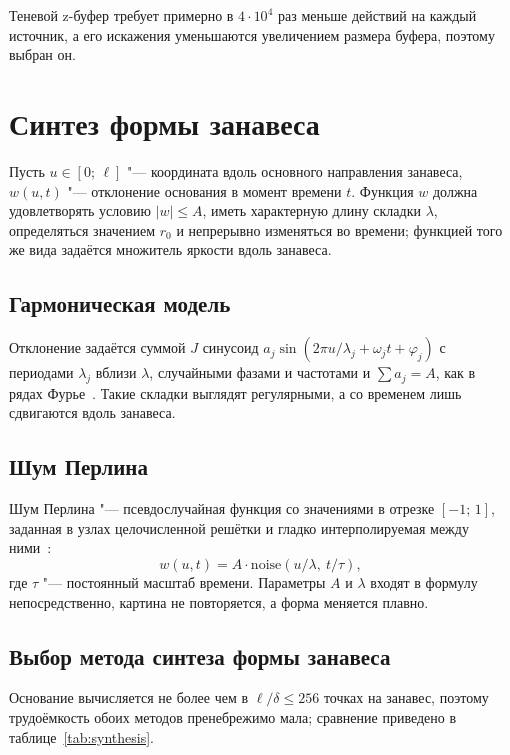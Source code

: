 Теневой z-буфер требует примерно в $4 \cdot 10^4$ раз меньше действий на каждый источник, а его искажения уменьшаются увеличением размера буфера, поэтому выбран он.

\section{Синтез формы занавеса}

Пусть $u \in [0;\, \ell]$ "--- координата вдоль основного направления занавеса, $w(u, t)$ "--- отклонение основания в момент времени $t$. Функция $w$ должна удовлетворять условию $|w| \leqslant A$, иметь характерную длину складки $\lambda$, определяться значением $r_0$ и непрерывно изменяться во времени; функцией того же вида задаётся множитель яркости вдоль занавеса.

\subsection{Гармоническая модель}

Отклонение задаётся суммой $J$ синусоид $a_j \sin(2\pi u / \lambda_j + \omega_j t + \varphi_j)$ с периодами $\lambda_j$ вблизи $\lambda$, случайными фазами и частотами и $\sum a_j = A$, как в рядах Фурье~\cite[с.~250]{gonzalez2012}. Такие складки выглядят регулярными, а со временем лишь сдвигаются вдоль занавеса.

\subsection{Шум Перлина}

Шум Перлина "--- псевдослучайная функция со значениями в отрезке $[-1;\, 1]$, заданная в узлах целочисленной решётки и гладко интерполируемая между ними~\cite{hill2002}:
\begin{equation}
	w(u, t) = A \cdot \mathrm{noise}\left( u / \lambda,\ t / \tau \right),
	\label{eq:perlin}
\end{equation}
где $\tau$ "--- постоянный масштаб времени. Параметры $A$ и $\lambda$ входят в формулу непосредственно, картина не повторяется, а форма меняется плавно.

\subsection{Выбор метода синтеза формы занавеса}

Основание вычисляется не более чем в $\ell / \delta \leqslant 256$ точках на занавес, поэтому трудоёмкость обоих методов пренебрежимо мала; сравнение приведено в таблице~\ref{tab:synthesis}.

